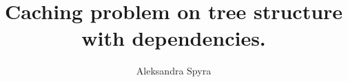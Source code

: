 \documentclass[a4paper,10pt]{article}
\title{Caching problem on tree structure with dependencies.}
\author{Aleksandra Spyra}
\begin{document}
\maketitle

\begin{abstract}

\end{abstract}

\tableofcontents






\end{document}
